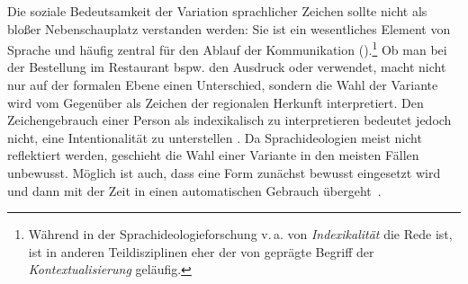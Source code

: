 Die soziale Bedeutsamkeit der Variation sprachlicher Zeichen sollte nicht als bloßer Nebenschauplatz verstanden werden: 
Sie ist ein wesentliches Element von Sprache und häufig zentral für den Ablauf der Kommunikation (\cites[s.][19]{Silverstein.1976}[131]{Gumperz.1982}[68]{Eckert.2016}).\footnote{Während in der Sprachideologieforschung v.\,a. von \textit{Indexikalität} die Rede ist, ist in anderen Teildisziplinen eher der von \citet{Gumperz.1982} geprägte Begriff der \textit{Kontextualisierung} geläufig.}
Ob man bei der Bestellung im Restaurant bspw. den Ausdruck  oder  verwendet, macht nicht nur auf der formalen Ebene einen Unterschied, sondern die Wahl der Variante wird vom Gegenüber als Zeichen der regionalen Herkunft interpretiert. 
Den Zeichengebrauch einer Person als indexikalisch zu interpretieren bedeutet jedoch nicht, eine Intentionalität zu unterstellen \citep[s.][78]{Eckert.2016}. 
Da Sprachideologien meist nicht reflektiert werden, geschieht die Wahl einer Variante in den meisten Fällen unbewusst. 
Möglich ist auch, dass eine Form zun{\"a}chst bewusst eingesetzt wird und dann mit der Zeit in einen automatischen Gebrauch {\"u}bergeht~\citep[s.][79]{Eckert.2016}.

